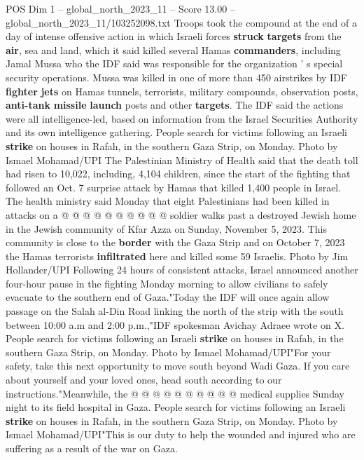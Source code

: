 \begin{textsample}{POS Dim 1 – global\_north\_2023\_11 – Score 13.00 – global\_north\_2023\_11/103252098.txt}  \label{ex:f1_pos_360}
Troops took the compound at the end of a day of intense offensive action in which Israeli forces \textbf{struck} \textbf{targets} from the \textbf{air}, sea and land, which it said killed several Hamas \textbf{commanders}, including Jamal Mussa who the IDF said was responsible for the organization ' s special security operations.
Mussa was killed in one of more than 450 airstrikes by IDF \textbf{fighter} \textbf{jets} on Hamas tunnels, terrorists, military compounds, observation posts, \textbf{anti-tank} \textbf{missile} \textbf{launch} posts and other \textbf{targets}.
The IDF said the actions were all intelligence-led, based on information from the Israel Securities Authority and its own intelligence gathering.
People search for victims following an Israeli \textbf{strike} on houses in Rafah, in the southern Gaza Strip, on Monday.
Photo by Ismael Mohamad/UPI The Palestinian Ministry of Health said that the death toll had risen to 10,022, including, 4,104 children, since the start of the fighting that followed an Oct. 7 surprise attack by Hamas that killed 1,400 people in Israel.
The health ministry said Monday that eight Palestinians had been killed in attacks on a @ @ @ @ @ @ @ @ @ @ soldier walks past a destroyed Jewish home in the Jewish community of Kfar Azza on Sunday, November 5, 2023.
This community is close to the \textbf{border} with the Gaza Strip and on October 7, 2023 the Hamas terrorists \textbf{infiltrated} here and killed some 59 Israelis.
Photo by Jim Hollander/UPI Following 24 hours of consistent attacks, Israel announced another four-hour pause in the fighting Monday morning to allow civilians to safely evacuate to the southern end of Gaza."Today the IDF will once again allow passage on the Salah al-Din Road linking the north of the strip with the south between 10:00 a.m and 2:00 p.m.,"IDF spokesman Avichay Adraee wrote on X.
People search for victims following an Israeli \textbf{strike} on houses in Rafah, in the southern Gaza Strip, on Monday.
Photo by Ismael Mohamad/UPI"For your safety, take this next opportunity to move south beyond Wadi Gaza.
If you care about yourself and your loved ones, head south according to our instructions."Meanwhile, the @ @ @ @ @ @ @ @ @ @ medical supplies Sunday night to its field hospital in Gaza.
People search for victims following an Israeli \textbf{strike} on houses in Rafah, in the southern Gaza Strip, on Monday.
Photo by Ismael Mohamad/UPI"This is our duty to help the wounded and injured who are suffering as a result of the war on Gaza.

\end{textsample}
